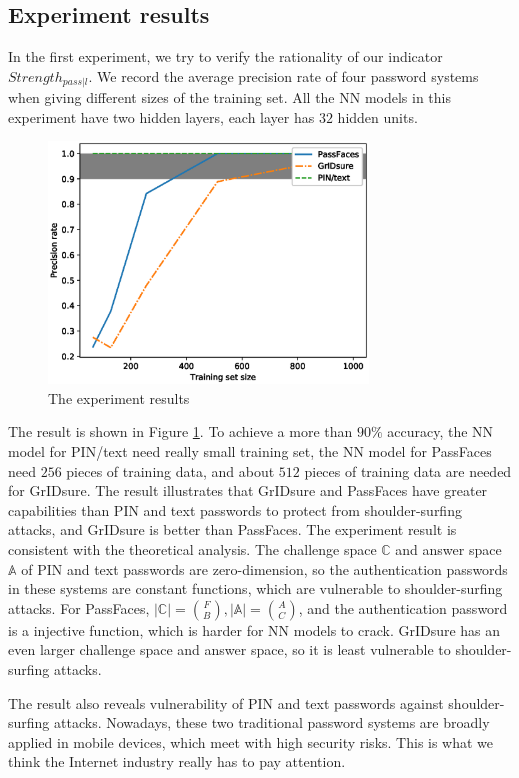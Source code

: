 \documentclass{article}
\begin{document}
  \subsection{Experiment results}
  In the first experiment, we try to verify the rationality of our indicator $Strength_{pass|l}$.  We record the average precision rate 
  of four password systems when giving different sizes of the training set. All the NN models in this experiment have two 
  hidden layers, each layer has $32$ hidden units. 
  \begin{figure}[htb]
    \centering
    \includegraphics[width=8.5cm]{line.eps}
    \caption{The experiment results}
    \label{fig:results}
  \end{figure}
  
  The result is shown in Figure \ref{fig:results}. To achieve a more than $90\%$ accuracy, the NN model for 
  PIN/text need really small training set, the NN model for PassFaces need $256$ pieces of training data, and 
  about $512$ pieces of training data are needed for GrIDsure. The result illustrates that GrIDsure and PassFaces 
  have greater capabilities than PIN and text passwords to protect from shoulder-surfing attacks, and GrIDsure 
  is better than PassFaces. The experiment result is consistent with the theoretical analysis. The challenge space $\mathbb{C}$
  and answer space $\mathbb{A}$ of PIN and text passwords are zero-dimension, so the authentication passwords in these systems 
  are constant functions, which are vulnerable to shoulder-surfing attacks. For PassFaces, 
  $|\mathbb{C}| = \binom{F}{B}, |\mathbb{A}| = \binom{A}{C}$, and the authentication password is a injective function, which 
  is harder for NN models to crack. GrIDsure has an even larger challenge space and answer space, so it is least 
  vulnerable to shoulder-surfing attacks.
  
  The result also reveals vulnerability of PIN and text passwords against shoulder-surfing attacks. Nowadays, 
  these two traditional password systems are broadly applied in mobile devices, which meet with high security 
  risks. This is what we think the Internet industry really has to pay attention.
  
\end{document}
